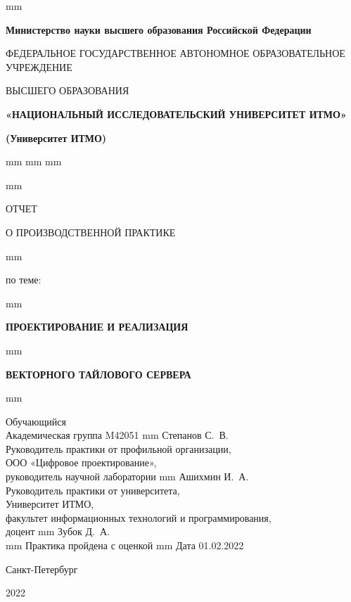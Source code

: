 \thispagestyle{empty}
 mm
\centerline{\footnotesize{\textbf{Министерство науки высшего образования Российской Федерации}}}
\centerline{\footnotesize{ФЕДЕРАЛЬНОЕ ГОСУДАРСТВЕННОЕ АВТОНОМНОЕ ОБРАЗОВАТЕЛЬНОЕ УЧРЕЖДЕНИЕ}}
\centerline{\small{ВЫСШЕГО ОБРАЗОВАНИЯ}}
\centerline{\textbf{«НАЦИОНАЛЬНЫЙ ИССЛЕДОВАТЕЛЬСКИЙ УНИВЕРСИТЕТ ИТМО»}}
\centerline{\textbf{(Университет ИТМО)}}
 mm
 mm
 mm



 mm
\centerline{\LARGE{ОТЧЕТ}}
\centerline{\LARGE{О ПРОИЗВОДСТВЕННОЙ ПРАКТИКЕ}}
 mm
\centerline{\large{по теме:}}
 mm
\centerline{\large\textbf{ПРОЕКТИРОВАНИЕ И РЕАЛИЗАЦИЯ}}
 mm
\centerline{\large\textbf{ВЕКТОРНОГО ТАЙЛОВОГО СЕРВЕРА}}

 mm

\noindent Обучающийся \\
Академическая группа M42051  mm Степанов С.~В.\\

\noindent Руководитель практики от профильной организации, \\
ООО «Цифровое проектирование», \\
руководитель научной лаборатории  mm Ашихмин И.~А.\\

\noindent Руководитель практики от университета, \\
Университет ИТМО, \\
факультет информационных технологий и программирования, \\
доцент  mm Зубок Д.~А.\\

 mm
\hfill {Практика пройдена с оценкой \makebox[10mm]{\hrulefill} }
 mm
\hfill Дата 01.02.2022

\vfill \hfil \break
\centerline{\large Санкт-Петербург } \centerline{ 2022 }



